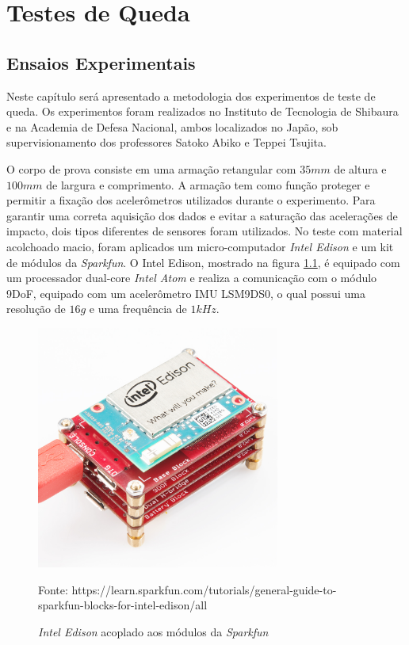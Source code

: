 \chapter{Testes de Queda}\label{cap:testesdequeda}

\section{Ensaios Experimentais}

Neste capítulo será apresentado a metodologia dos experimentos de teste de queda. Os experimentos foram realizados no Instituto de Tecnologia de Shibaura e na Academia de Defesa Nacional, ambos localizados no Japão, sob supervisionamento dos professores Satoko Abiko e Teppei Tsujita.

O corpo de prova consiste em uma armação retangular com $35mm$ de altura e $100mm$ de largura e comprimento. A armação tem como função proteger e permitir a fixação dos acelerômetros utilizados durante o experimento.
Para garantir uma correta aquisição dos dados e evitar a saturação das acelerações de impacto, dois tipos diferentes de sensores foram utilizados.
No teste com material acolchoado macio, foram aplicados um micro-computador \textit{Intel Edison} e um kit de módulos da \textit{Sparkfun}. O Intel Edison, mostrado na figura \ref{fig:edison}, é equipado com um processador dual-core \textit{Intel Atom} e realiza a comunicação com o módulo 9DoF, equipado com um acelerômetro IMU LSM9DS0, o qual possui uma resolução de $16g$ e uma frequência de $1kHz$.

 \begin{figure}[H]  
        \centering
        \caption{ \textit{Intel Edison} acoplado aos módulos da \textit{Sparkfun}}
        \includegraphics[width=8cm]{./figs/intel_edison.jpg}
        \par\medskip
        Fonte: https://learn.sparkfun.com/tutorials/general-guide-to-sparkfun-blocks-for-intel-edison/all
        \label{fig:edison}
\end{figure}

